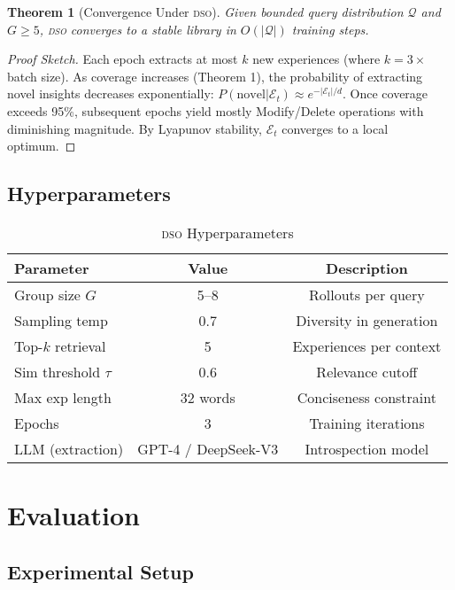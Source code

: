 \documentclass[11pt,letterpaper]{article}
\newtheorem{theorem}{Theorem}[section]
\newcommand{\DSO}{\textsc{dso}}
\begin{document}
\begin{theorem}[Convergence Under \DSO{}]
Given bounded query distribution $\mathcal{Q}$ and $G \geq 5$, \DSO{} converges to a stable library in $O(|\mathcal{Q}|)$ training steps.
\end{theorem}

\begin{proof}[Proof Sketch]
Each epoch extracts at most $k$ new experiences (where $k = 3 \times$ batch size). As coverage increases (Theorem 1), the probability of extracting novel insights decreases exponentially: $P(\text{novel} | \mathcal{E}_t) \approx e^{-|\mathcal{E}_t|/d}$. Once coverage exceeds 95\%, subsequent epochs yield mostly Modify/Delete operations with diminishing magnitude. By Lyapunov stability, $\mathcal{E}_t$ converges to a local optimum.
\end{proof}

\subsection{Hyperparameters}

\begin{table}[t]
\centering
\caption{\DSO{} Hyperparameters}
\label{tab:hyperparams}
\begin{tabular}{lcc}
\toprule
\textbf{Parameter} & \textbf{Value} & \textbf{Description} \\
\midrule
Group size $G$ & 5--8 & Rollouts per query \\
Sampling temp & 0.7 & Diversity in generation \\
Top-$k$ retrieval & 5 & Experiences per context \\
Sim threshold $\tau$ & 0.6 & Relevance cutoff \\
Max exp length & 32 words & Conciseness constraint \\
Epochs & 3 & Training iterations \\
LLM (extraction) & GPT-4 / DeepSeek-V3 & Introspection model \\
\bottomrule
\end{tabular}
\end{table}

\section{Evaluation}
\label{sec:evaluation}

\subsection{Experimental Setup}
\end{document}
